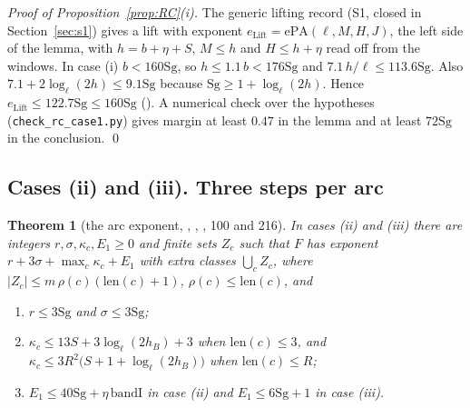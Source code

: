 \documentclass[11pt]{article}
\newcommand{\Sg}{\mathrm{Sg}}
\newtheorem{thm}[lemma]{Theorem}
\theoremstyle{definition}
\theoremstyle{remark}
\begin{document}
\noindent\emph{Proof of Proposition~\ref{prop:RC}(i).} The generic lifting record  (S1, closed in Section~\ref{sec:s1}) gives a lift with exponent $e_{\mathrm{Lift}}=\mathrm{ePA}(\ell,M,H,J)$, the left side of the lemma, with $h=b+\eta+S$, $M\le h$ and $H\le h+\eta$ read off from the windows. In case (i) $b<160\Sg$, so $h\le1.1\,b<176\Sg$ and $7.1\,h/\ell\le113.6\Sg$. Also $7.1+2\log_\ell(2h)\le9.1\Sg$ because $\Sg\ge1+\log_\ell(2h)$. Hence $e_{\mathrm{Lift}}\le122.7\Sg\le160\Sg$ (). A numerical check over the hypotheses (\texttt{check\_rc\_case1.py}) gives margin at least $0.47$ in the lemma and at least $72\Sg$ in the conclusion. \qed

\subsection*{Cases (ii) and (iii). Three steps per arc}

\begin{thm}[the arc exponent, , , , 100 and 216]\label{thm:arcexp}
In cases (ii) and (iii) there are integers $r,\sigma,\kappa_c,E_1\ge0$ and finite sets $Z_c$ such that $F$ has exponent $r+3\sigma+\max_c\kappa_c+E_1$ with extra classes $\bigcup_cZ_c$, where $\lvert Z_c\rvert\le m\,\rho(c)(\mathrm{len}(c)+1)$, $\rho(c)\le\mathrm{len}(c)$, and
\begin{enumerate}[label=(\roman*),itemsep=1pt]
\item $r\le3\Sg$ and $\sigma\le3\Sg$;
\item $\kappa_c\le13S+3\log_\ell(2h_B)+3$ when $\mathrm{len}(c)\le3$, and $\kappa_c\le3R^2\bigl(S+1+\log_\ell(2h_B)\bigr)$ when $\mathrm{len}(c)\le R$;
\item $E_1\le40\Sg+\eta\,\mathrm{bandI}$ in case (ii) and $E_1\le6\Sg+1$ in case (iii).
\end{enumerate}
\end{thm}
\end{document}
